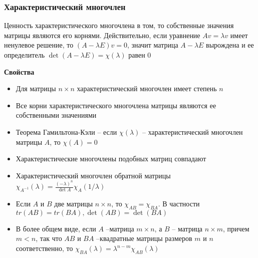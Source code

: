\documentclass{article}
\begin{document}
	
	\subsubsection{Характеристический многочлен}
	
	
	Ценность характеристического многочлена в том, то собственные значения матрицы являются его корнями. Действительно, если уравнение $Av = \lambda v$ имеет ненулевое решение, то $(A - \lambda E)v = 0$, значит матрица $A - \lambda E$ вырождена и ее определитель $\det (A - \lambda E) = \chi(\lambda)$ равен 0
	
	{\bf Свойства}
	
	\begin{itemize}
		\item Для матрицы $n \times n$ характеристический многочлен имеет степень $n$
		\item Все корни характеристического многочлена матрицы являются ее собственными значениями
		\item Теорема Гамильтона-Кэли -- если $\chi(\lambda)$ -- характеристический многочлен матрицы $A$, то $\chi(A) = 0$
		\item Характеристические многочлены подобных матриц совпадают
		\item Характеристический многочлен обратной матрицы $\chi_{A^{-1}}(\lambda) = \frac{(-\lambda)^n}{\det A}\chi_A(1/\lambda)$
		\item Если $A$ и $B$ две матрицы $n \times n$, то $\chi_{AB} = \chi_{BA}$. В частности $tr(AB) = tr(BA), \det(AB) = \det (BA)$
		\item В более общем виде, если $A$ --матрица $m \times n$, а $B$ -- матрица $n \times m$, причем $m < n$, так что $AB$ и $BA$ --квадратные матрицы размеров $m$ и $n$ соответственно, то $\chi_{BA}(\lambda) = \lambda ^{n - m}\chi_{AB}(\lambda)$ 
	\end{itemize}
	
\end{document}
